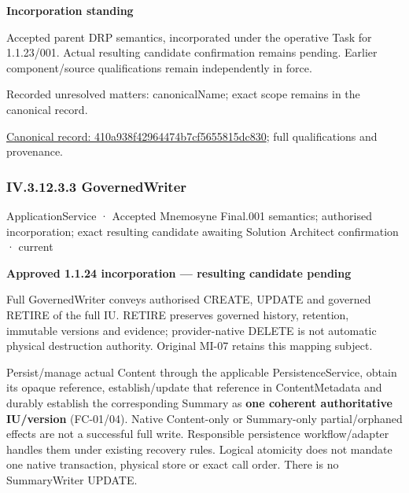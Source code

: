 \par\medskip\textbf{Incorporation standing}\par


Accepted parent DRP semantics, incorporated under the operative Task for 1.1.23/001. Actual resulting candidate confirmation remains pending. Earlier component/source qualifications remain independently in force.


{\small Recorded unresolved matters: canonicalName; exact scope remains in the canonical record.}\par
{\footnotesize \href{../../../../continuum/application/application-service/410a938f42964474b7cf5655815dc830.md}{Canonical record: 410a938f42964474b7cf5655815dc830}; full qualifications and provenance.}\par
\subsubsection*{IV.3.12.3.3 GovernedWriter}
\label{navigation:IV.3.12.3.3}

\label{element:105f6ebe61f74bc6b51938ba550bc1a7}
{\small ApplicationService · Accepted Mnemosyne Final.001 semantics; authorised incorporation; exact resulting candidate awaiting Solution Architect confirmation · current}\par

\par\medskip\textbf{Approved 1.1.24 incorporation — resulting candidate pending}\par


Full GovernedWriter conveys authorised CREATE, UPDATE and governed RETIRE of the full IU. RETIRE preserves governed history, retention, immutable versions and evidence; provider-native DELETE is not automatic physical destruction authority. Original MI-07 retains this mapping subject.



Persist/manage actual Content through the applicable PersistenceService, obtain its opaque reference, establish/update that reference in ContentMetadata and durably establish the corresponding Summary as \textbf{one coherent authoritative IU/version} (FC-01/04). Native Content-only or Summary-only partial/orphaned effects are not a successful full write. Responsible persistence workflow/adapter handles them under existing recovery rules. Logical atomicity does not mandate one native transaction, physical store or exact call order. There is no SummaryWriter UPDATE.



